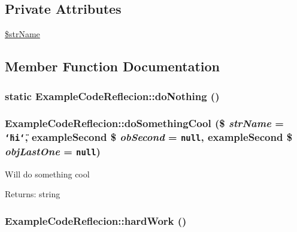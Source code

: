 \subsection*{Private Attributes}
\begin{CompactItemize}
\item 
\hyperlink{class_example_code_reflecion_b75ae13f02f4bec46f38e2094bf9c0aa}{\$strName}
\end{CompactItemize}


\subsection{Member Function Documentation}
\hypertarget{class_example_code_reflecion_4b0b162981e21241a43a9c9f8d54e51b}{
\subsubsection[{doNothing}]{\setlength{\rightskip}{0pt plus 5cm}static ExampleCodeReflecion::doNothing ()}}
\label{class_example_code_reflecion_4b0b162981e21241a43a9c9f8d54e51b}


\hypertarget{class_example_code_reflecion_6b52fd2c25ba4f6c8f14978a7239548b}{
\subsubsection[{doSomethingCool}]{\setlength{\rightskip}{0pt plus 5cm}ExampleCodeReflecion::doSomethingCool (\$ {\em strName} = {\tt \char`\"{}hi\char`\"{}}, \/  {\bf exampleSecond} \$ {\em obSecond} = {\tt null}, \/  {\bf exampleSecond} \$ {\em objLastOne} = {\tt null})}}
\label{class_example_code_reflecion_6b52fd2c25ba4f6c8f14978a7239548b}


Will do something cool

\begin{Desc}
\item[Returns:]string \end{Desc}
\hypertarget{class_example_code_reflecion_ed906325169515ba52dfaedeee3b54ea}{
\subsubsection[{hardWork}]{\setlength{\rightskip}{0pt plus 5cm}ExampleCodeReflecion::hardWork ()}}
\label{class_example_code_reflecion_ed906325169515ba52dfaedeee3b54ea}




